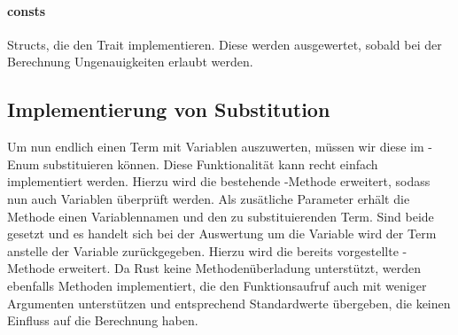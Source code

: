 \documentclass[11pt,a4paper, ngerman]{article}
\begin{document}
\paragraph{consts} Structs, die den Trait  implementieren. Diese werden ausgewertet, sobald bei der Berechnung Ungenauigkeiten erlaubt werden.

\subsection{Implementierung von Substitution} Um nun endlich einen Term mit Variablen auszuwerten, müssen wir diese im -Enum substituieren können. Diese Funktionalität kann recht einfach implementiert werden. Hierzu wird die bestehende -Methode erweitert, sodass nun auch Variablen überprüft werden. Als zusätliche Parameter erhält die Methode einen Variablennamen und den zu substituierenden Term. Sind beide gesetzt und es handelt sich bei der Auswertung um die Variable wird der Term anstelle der Variable zurückgegeben. Hierzu wird die bereits vorgestellte -Methode erweitert. Da Rust keine Methodenüberladung unterstützt, werden ebenfalls Methoden implementiert, die den Funktionsaufruf auch mit weniger Argumenten unterstützen und entsprechend Standardwerte übergeben, die keinen Einfluss auf die Berechnung haben.
\end{document}
